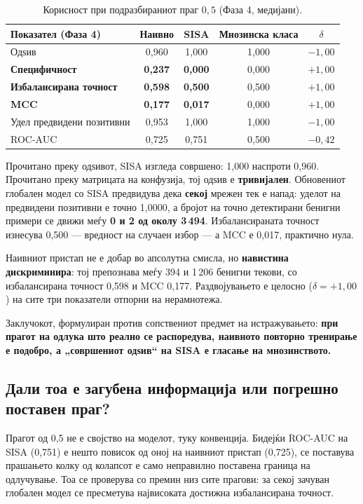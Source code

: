 \begin{table}[htbp]
\centering
\caption{Корисност при подразбираниот праг $0{,}5$ (Фаза 4, медијани).}
\label{tab:utility-default-threshold}
\begin{tabular}{lcccc}
\toprule
Показател (Фаза 4) & Наивно & SISA & Мнозинска класа & $\delta$ \\
\midrule
Одѕив & 0,960 & 1,000 & 1,000 & $-1{,}00$ \\
\textbf{Специфичност} & \textbf{0,237} & \textbf{0,000} & 0,000 & $+1{,}00$ \\
\textbf{Избалансирана точност} & \textbf{0,598} & \textbf{0,500} & 0,500 & $+1{,}00$ \\
\textbf{MCC} & \textbf{0,177} & \textbf{0,017} & 0,000 & $+1{,}00$ \\
Удел предвидени позитивни & 0,953 & 1,000 & 1,000 & $-1{,}00$ \\
ROC-AUC & 0,725 & 0,751 & 0,500 & $-0{,}42$ \\
\bottomrule
\end{tabular}
\end{table}

Прочитано преку одѕивот, SISA изгледа совршено: 1,000 наспроти 0,960. Прочитано преку
матрицата на конфузија, тој одѕив е \textbf{тривијален}. Обновениот глобален модел со SISA
предвидува дека \textbf{секој} мрежен тек е напад: уделот на предвидени позитивни е точно
1,0000, а бројот на точно детектирани бенигни примери се движи меѓу \textbf{0 и 2 од околу
3\,494}. Избалансираната точност изнесува 0,500 --- вредност на случаен избор --- а MCC е
0,017, практично нула.

Наивниот пристап не е добар во апсолутна смисла, но \textbf{навистина дискриминира}: тој
препознава меѓу 394 и 1\,206 бенигни текови, со избалансирана точност 0,598 и MCC 0,177.
Раздвојувањето е целосно ($\delta = +1{,}00$) на сите три показатели отпорни на нерамнотежа.

Заклучокот, формулиран против сопствениот предмет на истражувањето: \textbf{при прагот на одлука
што реално се распоредува, наивното повторно тренирање е подобро, а „совршениот одѕив“ на
SISA е гласање на мнозинството.}

\subsection{Дали тоа е загубена информација или погрешно поставен праг?}

Прагот од 0,5 не е својство на моделот, туку конвенција. Бидејќи ROC-AUC на SISA (0,751) е
нешто повисок од оној на наивниот пристап (0,725), се поставува прашањето колку од колапсот
е само неправилно поставена граница на одлучување. Тоа се проверува со премин низ сите
прагови: за секој зачуван глобален модел се пресметува највисоката достижна избалансирана
точност.

